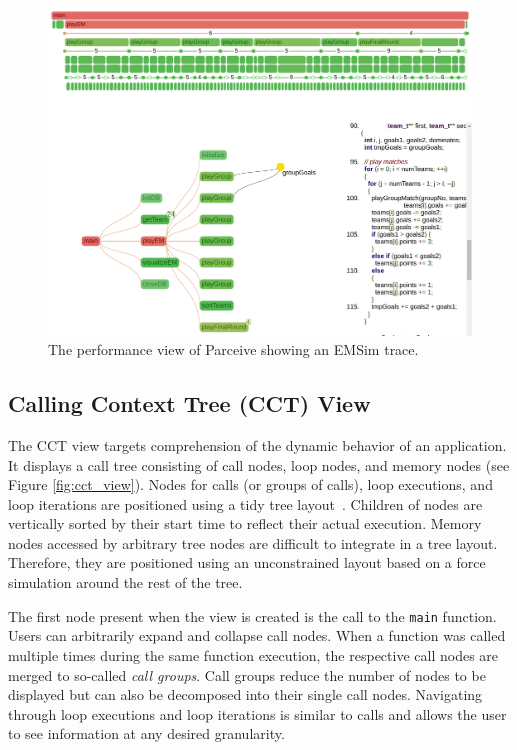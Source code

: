 \begin{figure}[ht!]
	\begin{center}
		\includegraphics[clip, trim=0.1cm 16.0cm 0.1cm 0.1cm,
width=\linewidth]{img/performance_view.pdf}
		\caption{The performance view of Parceive showing an EMSim trace.}
		\label{fig:emsim}
	\end{center}
\end{figure}

\subsection{Calling Context Tree (CCT) View}
The CCT view targets comprehension of the dynamic behavior of an application.
It displays a call tree consisting of call nodes, loop nodes, and memory nodes
(see Figure \ref{fig:cct_view}). Nodes for calls (or groups of calls), loop
executions, and loop iterations are positioned using a tidy tree
layout~\cite{TidierTree}. Children of nodes are vertically sorted by their
start time to reflect their actual execution. Memory nodes accessed by
arbitrary tree nodes are difficult to integrate in a tree layout. Therefore,
they are positioned using an unconstrained layout based on a force simulation
around the rest of the tree.

The first node present when the view is created is the call to the
\texttt{main} function. Users can arbitrarily expand and collapse call nodes.
When a function was called multiple times during the same function execution,
the respective call nodes are merged to so-called \textit{call groups}. Call
groups reduce the number of nodes to be displayed but can also be decomposed
into their single call nodes. Navigating through loop executions and loop
iterations is similar to calls and allows the user to see information at any
desired granularity. 

